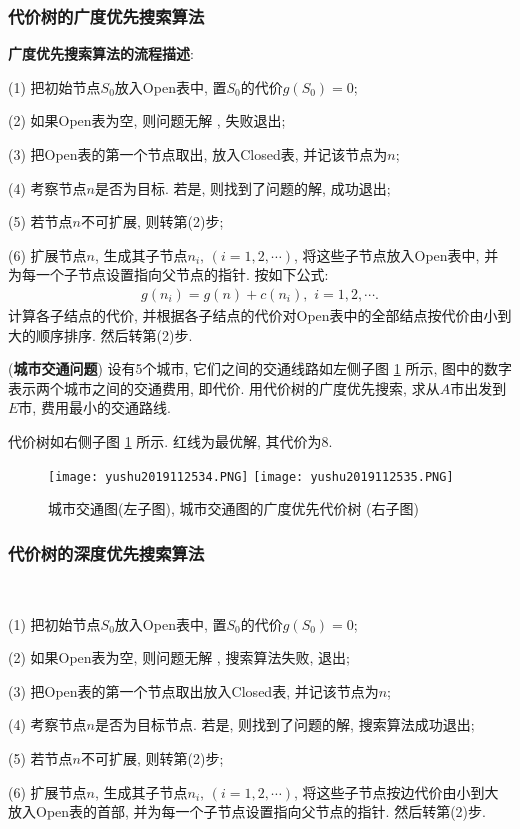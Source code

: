 \subsubsection{代价树的广度优先搜索算法}

\textbf{广度优先搜索算法的流程描述}:

\quad (1) 把初始节点$S_0$放入Open表中, 置$S_0$的代价$g(S_0)=0$;

\quad (2) 如果Open表为空, 则问题无解 , 失败退出;

\quad (3) 把Open表的第一个节点取出, 放入Closed表, 并记该节点为$n$;

\quad (4) 考察节点$n$是否为目标. 若是, 则找到了问题的解, 成功退出;

\quad (5) 若节点$n$不可扩展, 则转第(2)步;

\quad (6) 扩展节点$n$, 生成其子节点$n_i,\,(i=1, 2, \cdots)$, 将这些子节点放入Open表中, 并为每一个子节点设置指向父节点的指针. 按如下公式:
\begin{align}
    g(n_i)=g(n)+c(n_i),\,\,i=1,2,\cdots.
\end{align}
计算各子结点的代价, 并根据各子结点的代价对Open表中的全部结点按代价由小到大的顺序排序. 然后转第(2)步.
\begin{example}
    (\textbf{城市交通问题}) 设有5个城市, 它们之间的交通线路如左侧子图 \ref{AI32fig2019120234} 所示, 图中的数字表示两个城市之间的交通费用, 即代价.
    用代价树的广度优先搜索, 求从$A$市出发到$E$市, 费用最小的交通路线.
\end{example}
\begin{result}
代价树如右侧子图 \ref{AI32fig2019120234} 所示. 红线为最优解, 其代价为8.
\begin{figure}[H]
    \centering
    \texttt{[image: yushu2019112534.PNG]}
    \texttt{[image: yushu2019112535.PNG]}
    \caption{城市交通图(左子图), 城市交通图的广度优先代价树 (右子图)}
    \label{AI32fig2019120234}
\end{figure}
\subsubsection{代价树的深度优先搜索算法}~{}

\quad (1) 把初始节点$S_0$放入Open表中, 置$S_0$的代价$g(S_0)=0$;

\quad (2) 如果Open表为空, 则问题无解 , 搜索算法失败, 退出;

\quad (3) 把Open表的第一个节点取出放入Closed表, 并记该节点为$n$;

\quad (4) 考察节点$n$是否为目标节点. 若是, 则找到了问题的解, 搜索算法成功退出;

\quad (5) 若节点$n$不可扩展, 则转第(2)步;

\quad (6) 扩展节点$n$, 生成其子节点$n_i,\,(i=1, 2,\cdots)$, 将这些子节点按边代价由小到大放入Open表的首部, 并为每一个子节点设置指向父节点的指针. 然后转第(2)步.
\end{result}
